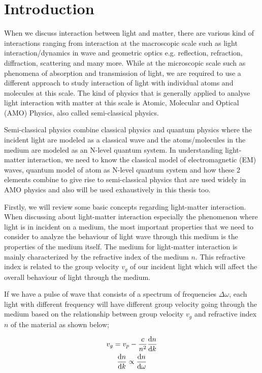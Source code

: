\chapter{Introduction}
When we discuss interaction between light and matter, there are various kind of interactions ranging from interaction at the macroscopic scale such as light interaction/dynamics in wave and geometric optics e.g. reflection, refraction, diffraction, scattering and many more. While at the microscopic scale such as phenomena of absorption and transmission of light, we are required to use a different approach to study interaction of light with individual atoms and molecules at this scale. The kind of physics that is generally applied to analyse light interaction with matter at this scale is Atomic, Molecular and Optical (AMO) Physics, also called semi-classical physics.

Semi-classical physics combine classical physics and quantum physics where the incident light are modeled as a classical wave and the atoms/molecules in the medium are modeled as an N-level quantum system. In understanding light-matter interaction, we need to know the classical model of electromagnetic (EM) waves, quantum model of atom as N-level quantum system and how these 2 elements combine to give rise to semi-classical physics that are used widely in AMO physics and also will be used exhaustively in this thesis too.

Firstly, we will review some basic concepts regarding light-matter interaction. When discussing about light-matter interaction especially the phenomenon where light is in incident on a medium, the most important properties that we need to consider to analyze the behaviour of light wave through this medium is the properties of the medium itself. The medium for light-matter interaction is mainly characterized by the refractive index of the medium $n$. This refractive index is related to the group velocity $v_g$ of our incident light which will affect the overall behaviour of light through the medium.

\newpage

If we have a pulse of wave that consists of a spectrum of frequencies $\Delta\omega$, each light with different frequency will have different group velocity going through the medium based on the relationship between group velocity $v_g$ and refractive index $n$ of the material as shown below;

\begin{gather}
	v_g = v_p - \frac{c}{n^2} \dv{n}{k} \label{eqn: groupVelocity}\\
	\dv{n}{k} \propto \dv{n}{\omega}
\end{gather}

